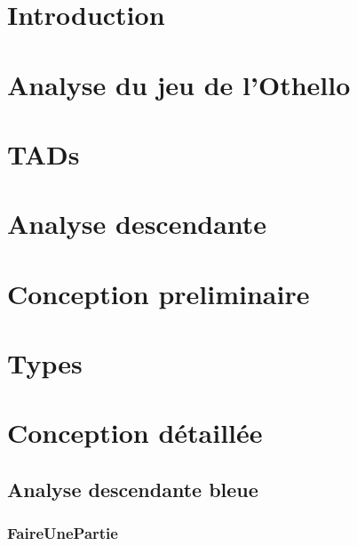 


  

  \newpage
  \tableofcontents

  \newpage
  \section{Introduction}
    

  \newpage
  \section{Analyse du jeu de l'Othello}
    

  \newpage
  \section{TADs}
    

  \newpage
  \section{Analyse descendante}
    

  \newpage
  \section{Conception preliminaire}
    
    
    

  \newpage
  \section{Types}
    

  \newpage
  \section{Conception détaillée}
  \subsection{Analyse descendante bleue}
     \subsubsection{FaireUnePartie}
      
